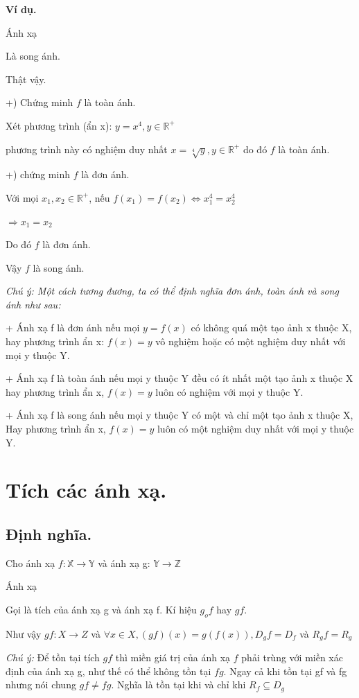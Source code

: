 \documentclass[12pt,oneside,a4paper,reqno]{book}
\begin{document}
\textbf{Ví dụ.}

Ánh xạ 

Là song ánh.

Thật vậy.

+) Chứng minh $f$ là toàn ánh.

Xét phương trình (ẩn x): $y=x^4, y\in \mathbb{R}^+$

phương trình này có nghiệm duy nhất $x=\sqrt[4]{y}, y\in \mathbb{R^+}$
do đó $f$ là toàn ánh.

+) chứng minh $f$ là đơn ánh.

Với mọi $x_1,x_2\in \mathbb{R}^+$, nếu $f(x_1 )=f(x_2 )\Leftrightarrow x_1^4=x_2^4$

$\Rightarrow x_1=x_2$

Do đó $f$ là đơn ánh.

Vậy $f$ là song ánh.

\textit{Chú ý: Một cách tương đương, ta có thể định nghĩa đơn ánh, toàn ánh và song ánh như sau:}

    + Ánh xạ f là đơn ánh nếu mọi $y=f(x)$ có không quá một tạo ảnh x thuộc X, hay phương trình ẩn x: $f(x)=y$ vô nghiệm hoặc có một nghiệm duy nhất với mọi y thuộc Y.
    
    + Ánh xạ f là toàn ánh nếu mọi y thuộc Y đều có ít nhất một tạo ảnh x thuộc X hay phương trình ẩn x, $f(x)=y$ luôn có nghiệm với mọi y thuộc Y.
    
    + Ánh xạ f là song ánh nếu mọi y thuộc Y có một và chỉ một tạo ảnh x thuộc X, Hay phương trình ẩn x, $f(x)=y$ luôn có một nghiệm duy nhất với mọi y thuộc Y.

\section{Tích các ánh xạ.}
\subsection{Định nghĩa.}

Cho ánh xạ $f: \mathbb{X}\to \mathbb{Y}$ và ánh xạ g: $\mathbb{Y}\to \mathbb{Z}$

Ánh xạ  

 \centerline{ }

Gọi là tích của ánh xạ g và ánh xạ f. Kí hiệu $g_o f$ hay $gf.$

Như vậy $gf:X\to Z$ và $\forall x\in X,(gf)(x)=g(f(x)),D_gf=D_f$  và $R_gf=R_g$

\emph{ Chú ý:} Để tồn tại tích $gf$ thì miền giá trị của ánh xạ $f$ phải trùng với miền xác định của ánh xạ g, như thế có thể không tồn tại $fg$. Ngay cả khi tồn tại gf và fg nhưng nói chung $gf\neq fg$. Nghĩa là tồn tại khi và chỉ khi $R_f \subseteq D_g$
\end{document}
